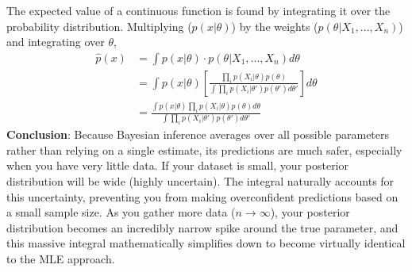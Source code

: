 \documentclass[../Probability.tex]{subfiles}
\begin{document}
\medskip
\noindent The expected value of a continuous function is found by integrating it over the probability distribution. Multiplying ($p(x|\theta)$) by the weights ($p(\theta|X_1, ..., X_n)$) and integrating over $\theta$,
\begin{align*}
    \hat{p}(x) &= \int p(x|\theta) \cdot p(\theta|X_1, ..., X_n) d\theta \\
    &= \int p(x|\theta) \left[ \frac{\prod_i p(X_i|\theta)p(\theta)}{\int \prod_i p(X_i|\theta')p(\theta')d\theta'} \right] d\theta \\ 
    &= \frac{\int p(x|\theta) \prod_i p(X_i|\theta)p(\theta)d\theta}{\int \prod_i p(X_i|\theta')p(\theta')d\theta'}
\end{align*}
\textbf{Conclusion}: Because Bayesian inference averages over all possible parameters rather than relying on a single estimate, its predictions are much safer, especially when you have very little data.
If your dataset is small, your posterior distribution will be wide (highly uncertain). The integral naturally accounts for this uncertainty, preventing you from making overconfident predictions based on a small sample size.
As you gather more data ($n \rightarrow \infty$), your posterior distribution becomes an incredibly narrow spike around the true parameter, and this massive integral mathematically simplifies down to become virtually identical to the MLE approach.
\end{document}
